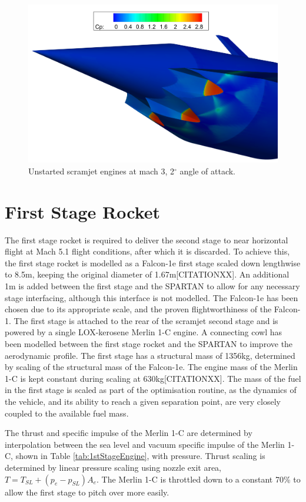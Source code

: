 \begin{figure}[ht]
	\centering
	\includegraphics[width=0.7\linewidth]{figures/3_vehicle_design/Unstart}
	\caption{Unstarted scramjet engines at mach 3, 2$^\circ$ angle of attack.}
	\label{fig:Unstart}
\end{figure}


\section{First Stage Rocket}\label{sec:firststage}
The first stage rocket is required to deliver the second stage to near horizontal flight at Mach 5.1 flight conditions,
after which it is discarded. To achieve this, the first stage rocket is modelled as a Falcon-1e first stage scaled down
lengthwise to 8.5m, keeping the original diameter of 1.67m[CITATIONXX]. An additional 1m is added between the first stage and the SPARTAN to allow for any necessary stage interfacing, although this interface is not modelled. 
The Falcon-1e has been chosen due to its appropriate scale, and the proven flightworthiness of the Falcon-1. 
 The first stage is attached to the rear of the scramjet
second stage and is powered by a single LOX-kerosene Merlin 1-C engine. A connecting cowl has been modelled between the first stage rocket and the SPARTAN to improve the aerodynamic profile.  The first stage has a structural mass of
1356kg, determined by scaling of the structural mass of the Falcon-1e. The engine mass of the Merlin 1-C is kept constant during scaling at 630kg[CITATIONXX]. The mass of the
fuel in the first stage is scaled as part of the optimisation routine, as the dynamics of the vehicle, and its ability to reach a
given separation point, are very closely coupled to the available fuel mass.

The thrust and specific impulse of the Merlin 1-C are determined by interpolation between the sea level and vacuum specific impulse of the Merlin 1-C, shown in Table \ref{tab:1stStageEngine}, with pressure. Thrust scaling is determined by linear pressure scaling using nozzle exit area, $T = T_{SL} + (p_e - p_{SL})A_e$. 
 The Merlin 1-C is throttled down to a constant 70\% to allow the first stage to pitch over more easily.

